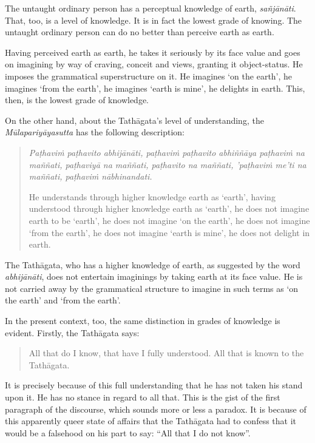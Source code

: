 The untaught ordinary person has a perceptual knowledge of earth, \emph{sañjānāti}. That, too, is a level of knowledge. It is in fact the lowest grade of knowing. The untaught ordinary person can do no better than perceive earth as earth.

Having perceived earth as earth, he takes it seriously by its face value and goes on imagining by way of craving, conceit and views, granting it object-status. He imposes the grammatical superstructure on it. He imagines `on the earth', he imagines `from the earth', he imagines `earth is mine', he delights in earth. This, then, is the lowest grade of knowledge.

On the other hand, about the Tathāgata's level of understanding, the \emph{Mūlapariyāyasutta} has the following description:

\begin{quote}
\emph{Paṭhaviṁ paṭhavito abhijānāti, paṭhaviṁ paṭhavito abhiññāya paṭhaviṁ na maññati, paṭhaviyā na maññati, paṭhavito na maññati, 'paṭhaviṁ me'ti na maññati, paṭhaviṁ nābhinandati.}

He understands through higher knowledge earth as `earth', having understood through higher knowledge earth as `earth', he does not imagine earth to be `earth', he does not imagine `on the earth', he does not imagine `from the earth', he does not imagine `earth is mine', he does not delight in earth.
\end{quote}

The Tathāgata, who has a higher knowledge of earth, as suggested by the word \emph{abhijānāti}, does not entertain imaginings by taking earth at its face value. He is not carried away by the grammatical structure to imagine in such terms as `on the earth' and `from the earth'.

In the present context, too, the same distinction in grades of knowledge is evident. Firstly, the Tathāgata says:

\begin{quote}
All that do I know, that have I fully understood. All that is known to the Tathāgata.
\end{quote}

It is precisely because of this full understanding that he has not taken his stand upon it. He has no stance in regard to all that. This is the gist of the first paragraph of the discourse, which sounds more or less a paradox. It is because of this apparently queer state of affairs that the Tathāgata had to confess that it would be a falsehood on his part to say: ``All that I do not know''.

